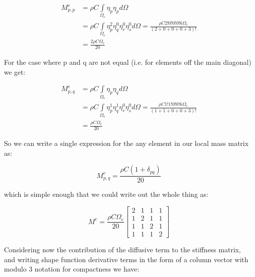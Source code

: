 \documentclass[12pt]{article}
\begin{document}
\begin{align*}
 M_{p,p}^e & = \rho C  \int\limits_{\Omega_e} \eta_p \eta_p d\Omega \\
              	& = \rho C \int\limits_{\Omega_e} \eta_p^2 \eta_q^0 \eta_r^0 \eta_s^0 d{\Omega}=
 \frac{\rho C 2!0!0!0!6\Omega_e}{(2+0+0+0+3)!} \\
 				& = \frac{2\rho C \Omega_e}{20}
\end{align*}

For the case where p and q are not equal (i.e. for elements off the main diagonal) we get:

\begin{align*}
 M_{p,q}^e & = \rho C \int\limits_{\Omega_e} \eta_p \eta_q d\Omega \\
              	& = \rho C \int\limits_{\Omega_e} \eta_p^1 \eta_q^1 \eta_r^0 \eta_s^0 d{\Omega}=
 \frac{\rho C 1!1!0!0!6\Omega_e}{(1+1+0+0+3)!} \\
 				& = \frac{\rho C \Omega_e}{20}
\end{align*}

So we can write a single expression for the any element in our local mass matrix as:

$$
M_{p,q}^e = \frac{\rho C (1+\delta_{pq})}{20}
$$

which is simple enough that we could write out the whole thing as:

\begin{equation}
M^e = \frac{\rho C \Omega_e}{20}{\begin{bmatrix} 2 & 1 & 1 & 1 \\ 1 & 2 & 1 & 1 \\ 1 & 1 & 2 & 1 \\ 1 & 1 & 1 & 2 \end{bmatrix}}
\end{equation}

Considering now the contribution of the diffusive term to the stiffness matrix, and writing shape function derivative terms in the form of a column vector with modulo 3 notation for compactness we have:
\end{document}
